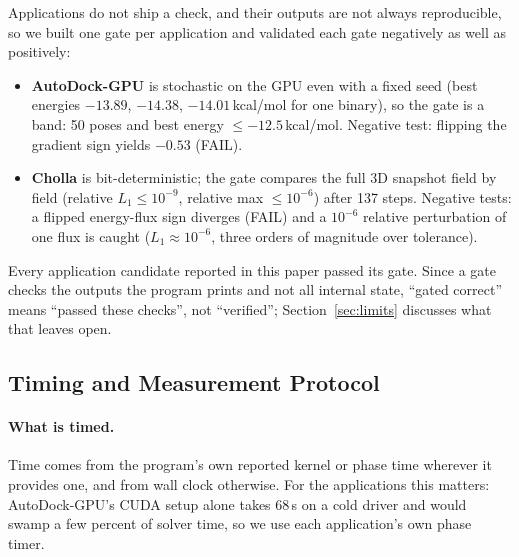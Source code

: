 Applications do not ship a check, and their outputs are not always reproducible, so we built one gate
per application and validated each gate negatively as well as positively:
\begin{itemize}\itemsep2pt
  \item \textbf{AutoDock-GPU} is stochastic on the GPU even with a fixed seed (best energies
    $-13.89$, $-14.38$, $-14.01$\,kcal/mol for one binary), so the gate is a band: 50 poses and best
    energy $\le -12.5$\,kcal/mol. Negative test: flipping the gradient sign yields $-0.53$ (FAIL).
  \item \textbf{Cholla} is bit-deterministic; the gate compares the full 3D snapshot field by field
    (relative $L_1 \le 10^{-9}$, relative max $\le 10^{-6}$) after 137 steps. Negative tests: a flipped
    energy-flux sign diverges (FAIL) and a $10^{-6}$ relative perturbation of one flux is caught
    ($L_1 \approx 10^{-6}$, three orders of magnitude over tolerance).
\end{itemize}
Every application candidate reported in this paper passed its gate. Since a gate checks the outputs the
program prints and not all internal state, ``gated correct'' means ``passed these checks'', not
``verified''; Section~\ref{sec:limits} discusses what that leaves open.

\subsection{Timing and Measurement Protocol}
\label{sec:timing}
\paragraph{What is timed.}
Time comes from the program's own reported kernel or phase time wherever it provides one, and from wall
clock otherwise. For the applications this matters: AutoDock-GPU's CUDA setup alone takes $68$\,s on a
cold driver and would swamp a few percent of solver time, so we use each application's own phase timer.

